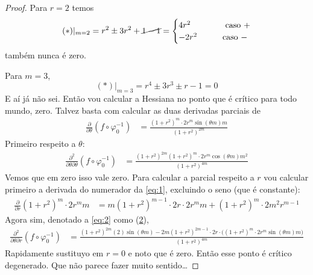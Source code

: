\begin{proof}
Para \(r=2\) temos
\[(*)|_{m=2}=r^{2} \pm  3 r^2 +  \cancel{1-1} = \begin{cases}
	4r^2\qquad & \text{ caso \(+\)}\\
	-2r^2\qquad &\text{caso \(-\)} 
\end{cases}\]
também nunca é zero.

Para \(m=3\),
\[(*)|_{m=3}=r^4 \pm  3 r^3 \pm  r-1=0\]
E aí já não sei. Então vou calcular a Hessiana no ponto que é crítico para todo mundo, zero. Talvez basta com calcular as duas derivadas parciais de
\begin{align}\label{eq:1}
\frac{\partial }{\partial \theta}(f \circ \varphi_0^{-1})&= \frac{(1+r^2)^m\cdot  2r^m \sin(\theta m)m}{(1+r^2)^{2m}}
\end{align}
Primeiro respeito a \(\theta\):
\begin{align*}
\frac{\partial^2 }{\partial \theta\partial \theta}(f \circ \varphi_0^{-1})&=\frac{(1+r^2)^{2m}(1+r^2)^m\cdot 2r^m \cos(\theta m)m^2}{(1+r^2)^{4m}}
\end{align*}
Vemos que em zero isso vale zero. Para calcular a parcial respeito a \(r\) vou calcular primeiro a derivada do numerador da \cref{eq:1}, excluindo o seno (que é constante):
\begin{align}\label{eq:2}
\frac{\partial }{\partial r}(1+r^2)^m\cdot 2r^m m&=m(1+r^2)^{m-1}\cdot 2r\cdot 2r^m m+(1+r^2)^m \cdot 2m^2r^{m-1}
\end{align}
Agora sim, denotado a \cref{eq:2} como (\hyperref[eq:2]{2}),
\begin{align*}
\frac{\partial^2 }{\partial \theta\partial r}(f \circ \varphi_0^{-1})&=\frac{(1+r^2)^{2m}(\hyperref[eq:2]{2})\sin(\theta m)-2m(1+r^2)^{2m-1}\cdot 2r\cdot \Big((1+r^2)^m\cdot 2r^m \sin(\theta m)m\Big)}{(1+r^2)^{4m}}
\end{align*}
Rapidamente sustituyo em \(r=0\) e noto que é zero. Então esse ponto é crítico degenerado. Que não parece fazer muito sentido…

\end{proof}

\iffalse\begin{proof}[Solution]\leavevmode
	Considere a carta \(\varphi_0:\{z_0=1\}\subset\mathbb{C}P^{1}\to \mathbb{C}\), \([1:z]\mapsto z\). Obtemos
\begin{align*}
\frac{\partial }{\partial z}(f \circ \varphi_0^{-1})&=\frac{(1+|z|^2)^m \frac{\partial |1+z^m|^2}{\partial z}-m(1+|z|^2)^{m-1}\cdot \bar{z}\cdot |1+z^m|^2}{(1+|z|^2)^{2m}}.
\end{align*}
Calculamos com calma
\[\frac{\partial |1+z^m|^2}{\partial z}=\frac{\partial }{\partial z}(1+z^m)\overline{(1+z^m)}=(1+z^m)\cdot 0+mz^{m-1}\overline{(1+z^m)}\]
E sustituimos:
\begin{align*}
\frac{\partial }{\partial z}(f \circ \varphi_0^{-1})&=\frac{(1+|z|^2)^m \cdot mz^{m-1}\overline{(1+z^m)}-m(1+|z|^2)^{m-1}\cdot \bar{z}\cdot |1+z^m|^2}{(1+|z|^2)^{2m}}.
\end{align*}
\end{proof}\fi

